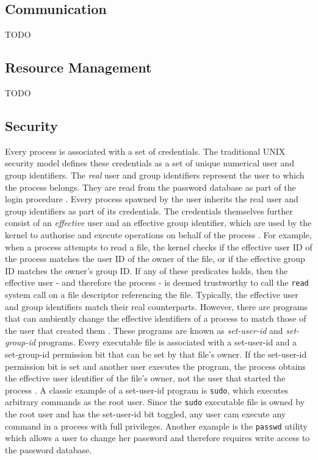 
\subsection{Communication}
\label{ch:fundamentals/processes/communication}
TODO
\subsection{Resource Management}
\label{ch:fundamentals/processes/resource-management}
TODO 
\subsection{Security}
\label{ch:fundamentals/processes/security}
Every process is associated with a set of credentials. 
The traditional UNIX security model defines these credentials 
as a set of unique numerical user and group identifiers. The \textit{real} user and group identifiers 
represent the user to which the process belongs. They are read from the 
password database as part of the login procedure \cite{10.5555/1869911}. 
Every process spawned by the user inherits the real user and group identifiers as part of 
its credentials. 
The credentials themselves further consist of an \textit{effective} user and an effective group identifier,
which are used by the kernel to authorise and execute operations on behalf of the process \cite{10.5555/1869911}.
For example, when a process attempts to read a file, the kernel checks if the effective user ID
of the process matches the user ID of the owner of the file, or if the effective group ID matches the 
owner's group ID. If any of these predicates holds, then the effective user - and therefore the process - 
is deemed trustworthy to call the \verb|read| system call on a file descriptor referencing the file.
Typically, the effective user and group identifiers match their real counterparts. However, there 
are programs that can ambiently change the effective identifiers of a process to match 
those of the user that created them \cite{10.5555/1869911}. These programs are known as 
\textit{set-user-id} and \textit{set-group-id} programs. Every executable file is associated with 
a set-user-id and a set-group-id permission bit that can be set by that file's owner. 
If the set-user-id permission bit is set and another user executes the program, the process
obtains the effective user identifier of the file's owner, not the user that started the process \cite{10.5555/1869911}.
A classic example of a set-user-id program is \verb|sudo|, which executes arbitrary commands as the 
root user. Since the \verb|sudo| executable file is
owned by the root user and has the set-user-id bit toggled, any user cam execute any command 
in a process with full privileges. Another example is the \verb|passwd| utility which allows a user 
to change her password and therefore requires write access to the password database.  

